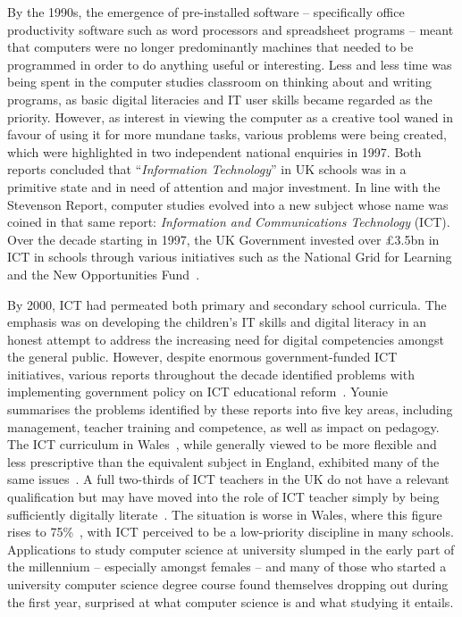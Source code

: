 \documentclass{llncs}
\begin{document}
By the 1990s, the emergence of pre-installed software -- specifically
office productivity software such as word processors and spreadsheet
programs -- meant that computers were no longer predominantly machines
that needed to be programmed in order to do anything useful or
interesting.  Less and less time was being spent in the computer
studies classroom on thinking about and writing programs, as basic
digital literacies and IT user skills became regarded as the
priority. However, as interest in viewing the computer as a creative
tool waned in favour of using it for more mundane tasks, various
problems were being created, which were highlighted in two independent
national enquiries in 1997.  Both reports concluded that
``{\emph{Information Technology}}'' in UK schools was in a primitive
state and in need of attention and major investment. In line with the
Stevenson Report, computer studies evolved into a new subject whose
name was coined in that same report: {\emph{Information and
Communications Technology}} (ICT).  Over the decade starting in 1997,
the UK Government invested over \pounds3.5bn in ICT in schools through
various initiatives such as the National Grid for Learning and the New
Opportunities Fund~\cite{Doughty:2006}.


By 2000, ICT had permeated both primary and secondary school
curricula. The emphasis was on developing the children's IT skills and
digital literacy in an honest attempt to address the increasing need
for digital competencies amongst the general public.  However, despite
enormous government-funded ICT initiatives, various reports throughout
the decade identified problems with implementing government policy on
ICT educational
reform~\cite{OpieFukuyo:2000,Ofsted:2001,Ofsted:2002,Ofsted:2004,Loveless:2005}.
Younie~\cite{Younie:2006} summarises the problems identified by these
reports into five key areas, including management, teacher training
and competence, as well as impact on pedagogy. The ICT curriculum in
Wales~\cite{welshictcurric:2008}, while generally viewed to be more
flexible and less prescriptive than the equivalent subject in England,
exhibited many of the same issues~\cite{estynict:2013,estynict:2014}.
A full two-thirds of ICT teachers in the UK do not have a relevant
qualification but may have moved into the role of ICT teacher simply
by being sufficiently digitally literate~\cite{RoyalSoc:2012}.  The
situation is worse in Wales, where this figure rises to
75\%~\cite{GTCW:2008}, with ICT perceived to be a low-priority
discipline in many schools. Applications to study computer science at
university slumped in the early part of the millennium -- especially
amongst females -- and many of those who started a university computer
science degree course found themselves dropping out during the first
year, surprised at what computer science is and what studying it
entails.
\end{document}
